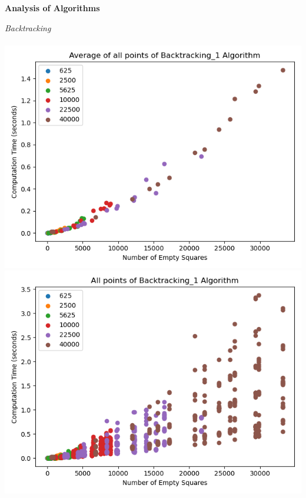 \documentclass{article}
\begin{document}
\pagebreak

\noindent \textbf{Analysis of Algorithms}



\noindent \textit{Backtracking} \\ \\
\includegraphics[scale=0.5]{scatter_avg_Backtracking_1-1.png}
\includegraphics[scale=0.5]{scatter_Backtracking_1-1.png}

\bigskip
\end{document}
